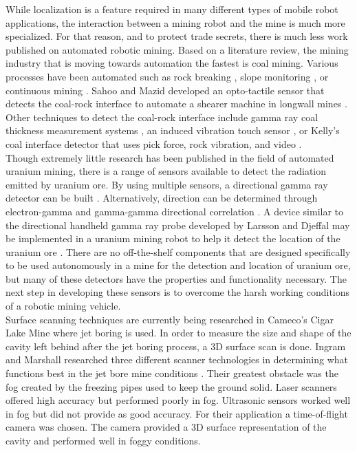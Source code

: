 While localization is a feature required in many different types of mobile robot applications, the interaction between a mining robot and the mine is much more specialized. For that reason, and to protect trade secrets, there is much less work published on automated robotic mining. Based on a literature review, the mining industry that is moving towards automation the fastest is coal mining. Various processes have been automated such as rock breaking \cite{breaker}, slope monitoring \cite{slope}, or continuous mining \cite{both}. Sahoo and Mazid developed an opto-tactile sensor that detects the coal-rock interface to automate a shearer machine in longwall mines \cite{opto}. Other techniques to detect the coal-rock interface include gamma ray coal thickness measurement systems \cite{gamma}, an induced vibration touch sensor \cite{vibe}, or Kelly's coal interface detector that uses pick force, rock vibration, and video \cite{kelly}.\\

Though extremely little research has been published in the field of automated uranium mining, there is a range of sensors available to detect the radiation emitted by uranium ore. By using multiple sensors, a directional gamma ray detector can be built \cite{chip}. Alternatively, direction can be determined through electron-gamma and gamma-gamma directional correlation \cite{eggg}. A device similar to the directional handheld gamma ray probe developed by Larsson and Djeffal may be implemented in a uranium mining robot to help it detect the location of the uranium ore \cite{dj}. There are no off-the-shelf components that are designed specifically to be used autonomously in a mine for the detection and location of uranium ore, but many of these detectors have the properties and functionality necessary. The next step in developing these sensors is to overcome the harsh working conditions of a robotic mining vehicle.\\

Surface scanning techniques are currently being researched in Cameco's Cigar Lake Mine where jet boring is used. In order to measure the size and shape of the cavity left behind after the jet boring process, a 3D surface scan is done. Ingram and Marshall researched three different scanner technologies in determining what functions best in the jet bore mine conditions \cite{ingjet}. Their greatest obstacle was the fog created by the freezing pipes used to keep the ground solid. Laser scanners offered high accuracy but performed poorly in fog. Ultrasonic sensors worked well in fog but did not provide as good accuracy. For their application a time-of-flight camera was chosen. The camera provided a 3D surface representation of the cavity and performed well in foggy conditions.\\

